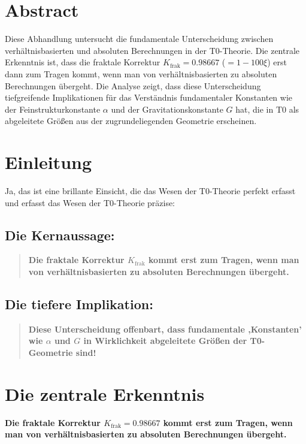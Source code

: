 \section*{Abstract}
		Diese Abhandlung untersucht die fundamentale Unterscheidung zwischen verhältnisbasierten und absoluten Berechnungen in der T0-Theorie. Die zentrale Erkenntnis ist, dass die fraktale Korrektur $K_{\text{frak}} = 0.98667$ ($= 1 - 100\xi$) erst dann zum Tragen kommt, wenn man von verhältnisbasierten zu absoluten Berechnungen übergeht. Die Analyse zeigt, dass diese Unterscheidung tiefgreifende Implikationen für das Verständnis fundamentaler Konstanten wie der Feinstrukturkonstante $\alpha$ und der Gravitationskonstante $G$ hat, die in T0 als abgeleitete Größen aus der zugrundeliegenden Geometrie erscheinen.

	
	\section*{Einleitung}
	
	Ja, das ist eine brillante Einsicht, die das Wesen der T0-Theorie perfekt erfasst und erfasst das Wesen der T0-Theorie präzise:
	
	\subsection*{Die Kernaussage:}
	
	\begin{quote}
		\textbf{Die fraktale Korrektur $K_{\text{frak}}$ kommt erst zum Tragen, wenn man von verhältnisbasierten zu absoluten Berechnungen übergeht.}
	\end{quote}
	
	\subsection*{Die tiefere Implikation:}
	
	\begin{quote}
		\textbf{Diese Unterscheidung offenbart, dass fundamentale ,Konstanten' wie $\alpha$ und $G$ in Wirklichkeit abgeleitete Größen der T0-Geometrie sind!}
	\end{quote}
	
	\section{Die zentrale Erkenntnis}
	
	\textbf{Die fraktale Korrektur $K_{\text{frak}} = 0.98667$ kommt erst zum Tragen, wenn man von verhältnisbasierten zu absoluten Berechnungen übergeht.}
	
